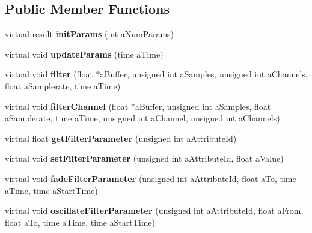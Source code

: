 \subsection*{Public Member Functions}
\begin{DoxyCompactItemize}
\item 
\mbox{\label{class_so_loud_1_1_filter_instance_a3546d0b3c87e4a44cea482fa3c1ce2ef}} 
virtual result {\bfseries init\+Params} (int a\+Num\+Params)
\item 
\mbox{\label{class_so_loud_1_1_filter_instance_ac2b293594bd3aed7bc70bb1fe1e8da95}} 
virtual void {\bfseries update\+Params} (time a\+Time)
\item 
\mbox{\label{class_so_loud_1_1_filter_instance_a65d38ac0562733c195898018b6c3ff47}} 
virtual void {\bfseries filter} (float $\ast$a\+Buffer, unsigned int a\+Samples, unsigned int a\+Channels, float a\+Samplerate, time a\+Time)
\item 
\mbox{\label{class_so_loud_1_1_filter_instance_aa4ad1fcd3c9f37262cbdf4467109a12f}} 
virtual void {\bfseries filter\+Channel} (float $\ast$a\+Buffer, unsigned int a\+Samples, float a\+Samplerate, time a\+Time, unsigned int a\+Channel, unsigned int a\+Channels)
\item 
\mbox{\label{class_so_loud_1_1_filter_instance_a8d709cb743fc9a80eed830adafa399a4}} 
virtual float {\bfseries get\+Filter\+Parameter} (unsigned int a\+Attribute\+Id)
\item 
\mbox{\label{class_so_loud_1_1_filter_instance_aa4ee94f287006e35a0f1582ff471a62a}} 
virtual void {\bfseries set\+Filter\+Parameter} (unsigned int a\+Attribute\+Id, float a\+Value)
\item 
\mbox{\label{class_so_loud_1_1_filter_instance_a9a3f9f37aac5e782e2f3c1260bdc15f4}} 
virtual void {\bfseries fade\+Filter\+Parameter} (unsigned int a\+Attribute\+Id, float a\+To, time a\+Time, time a\+Start\+Time)
\item 
\mbox{\label{class_so_loud_1_1_filter_instance_a219b1fb211b5599bf70f0d6403522978}} 
virtual void {\bfseries oscillate\+Filter\+Parameter} (unsigned int a\+Attribute\+Id, float a\+From, float a\+To, time a\+Time, time a\+Start\+Time)
\end{DoxyCompactItemize}
